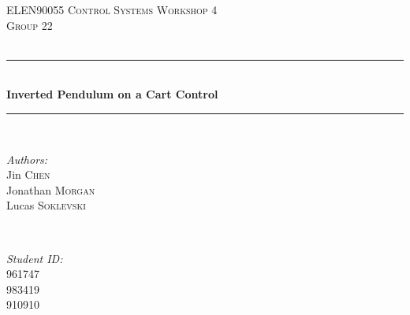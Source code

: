 \documentclass[a4paper]{article}
\begin{document}
	
\newcommand{\HRule}{\rule{\linewidth}{0.5mm}} %
	
\begin{center} %
	\thispagestyle{plain}
	
	\textsc{\LARGE ELEN90055 Control Systems Workshop 4}\\[1.5cm] %
	\textsc{\Large Group 22}\\[0.5cm] %
	\textsc{\large }\\[0.5cm] %
	
	
	\HRule \\[0.4cm]
	{ \huge \bfseries Inverted Pendulum on a Cart Control }\\[0.4cm] %
	\HRule \\[1.5cm]
	
	
	\begin{minipage}{0.4\textwidth}
		\begin{flushleft} \large
			\emph{Authors:}\\
			Jin \textsc{Chen} \\
			Jonathan \textsc{Morgan} \\
			Lucas \textsc{Soklevski}
		\end{flushleft}
	\end{minipage}
	~
	\begin{minipage}{0.4\textwidth}
		\begin{flushright} \large
			\emph{Student ID:} \\
			\textsc{961747} \\
			\textsc{983419} \\
			\textsc{910910}
		\end{flushright}
	\end{minipage}\\[2cm]
	

\end{center}
\end{document}
